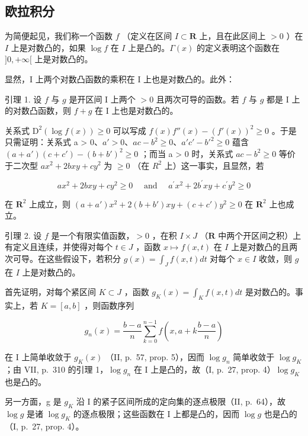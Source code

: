 \subsection{欧拉积分}

为简便起见，我们称一个函数 \(f\) （定义在区间 \(I \subset \mathbf{R}\) 上，且在此区间上 \(> 0\) ）在 \(I\) 上是对数凸的，如果 \(\log f\) 在 \(I\) 上是凸的。\(\Gamma(x)\) 的定义表明这个函数在 \(]0, +\infty[\) 上是对数凸的。

显然，I 上两个对数凸函数的乘积在 I 上也是对数凸的。此外：

引理 1. 设 \(f\) 与 \(g\) 是开区间 I 上两个 \(> 0\) 且两次可导的函数。若 \(f\) 与 \(g\) 都是 I 上的对数凸函数，则 \(f + g\) 在 I 上也是对数凸的。

关系式 \(\mathrm{D}^{2}\left(\log f(x)\right) \geqslant 0\) 可以写成 \(f(x)f''(x) - \left(f'(x)\right)^{2} \geqslant 0\) 。于是只需证明：关系式 a \textgreater{} 0、\(a' > 0\)、\(ac - b^{2} \geqslant 0\)、\(a'c' - b'^{2} \geqslant 0\) 蕴含 \((a + a')(c + c') - (b + b')^{2} \geqslant 0\) ；而当 a \textgreater{} 0 时，关系式 \(ac - b^{2} \geqslant 0\) 等价于二次型 \(ax^{2} + 2bxy + cy^{2}\) 为 \(\geqslant 0\) （在 \(R^{2}\) 上）这一事实，且显然，若

\[
a x ^ {2} + 2 b x y + c y ^ {2} \geqslant 0 \quad \text { and } \quad a ^ {\prime} x ^ {2} + 2 b ^ {\prime} x y + c ^ {\prime} y ^ {2} \geqslant 0
\]

在 \(\mathbf{R}^{2}\) 上成立，则 \((a + a')x^{2} + 2(b + b')xy + (c + c')y^{2} \geqslant 0\) 在 \(\mathbf{R}^{2}\) 上也成立。

引理 2. 设 \(f\) 是一个有限实值函数，\(>0\) ，在积 \(I \times J\) （\(\mathbf{R}\) 中两个开区间之积）上有定义且连续，并使得对每个 \(t \in J\) ，函数 \(x \mapsto f(x,t)\) 在 \(I\) 上是对数凸的且两次可导。在这些假设下，若积分 \(g(x) = \int_{J} f(x,t) dt\) 对每个 \(x \in I\) 收敛，则 \(g\) 在 \(I\) 上是对数凸的。

首先证明，对每个紧区间 \(K \subset J\) ，函数 \(g_{K}(x) = \int_{K} f(x, t) dt\) 是对数凸的。事实上，若 \(K = [a, b]\) ，则函数序列

\[
g _ {n} (x) = \frac {b - a}{n} \sum_ {k = 0} ^ {n - 1} f \left(x, a + k \frac {b - a}{n}\right)
\]

在 I 上简单收敛于 \(g_{K}(x)\) （II, p.~57, prop. 5），因而 \(\log g_{n}\) 简单收敛于 \(\log g_{K}\) ；由 VII, p.~310 的引理 1，\(\log g_{n}\) 在 I 上是凸的，故（I, p.~27, prop. 4）\(\log g_{K}\) 也是凸的。

另一方面，g 是 \(g_{K}\) 沿 I 的紧子区间所成的定向集的逐点极限（II, p.~64），故 \(\log g\) 是诸 \(\log g_{K}\) 的逐点极限；这些函数在 I 上都是凸的，因而 \(\log g\) 也是凸的（I, p.~27, prop. 4）。

